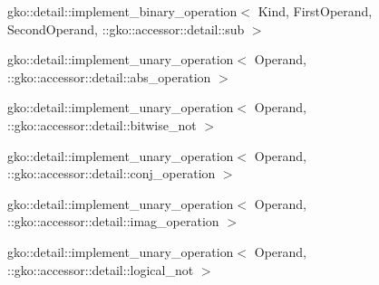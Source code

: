 \begin{DoxyCompactList}
\begin{DoxyCompactList}
\end{DoxyCompactList}
\item gko\+:\+:detail\+:\+:implement\+\_\+binary\+\_\+operation$<$ Kind, First\+Operand, Second\+Operand, \+:\+:gko\+:\+:accessor\+:\+:detail\+:\+:sub $>$\begin{DoxyCompactList}
\item {}
\end{DoxyCompactList}
\item gko\+:\+:detail\+:\+:implement\+\_\+unary\+\_\+operation$<$ Operand, \+:\+:gko\+:\+:accessor\+:\+:detail\+:\+:abs\+\_\+operation $>$\begin{DoxyCompactList}
\item {}
\end{DoxyCompactList}
\item gko\+:\+:detail\+:\+:implement\+\_\+unary\+\_\+operation$<$ Operand, \+:\+:gko\+:\+:accessor\+:\+:detail\+:\+:bitwise\+\_\+not $>$\begin{DoxyCompactList}
\item {}
\end{DoxyCompactList}
\item gko\+:\+:detail\+:\+:implement\+\_\+unary\+\_\+operation$<$ Operand, \+:\+:gko\+:\+:accessor\+:\+:detail\+:\+:conj\+\_\+operation $>$\begin{DoxyCompactList}
\item {}
\end{DoxyCompactList}
\item gko\+:\+:detail\+:\+:implement\+\_\+unary\+\_\+operation$<$ Operand, \+:\+:gko\+:\+:accessor\+:\+:detail\+:\+:imag\+\_\+operation $>$\begin{DoxyCompactList}
\item {}
\end{DoxyCompactList}
\item gko\+:\+:detail\+:\+:implement\+\_\+unary\+\_\+operation$<$ Operand, \+:\+:gko\+:\+:accessor\+:\+:detail\+:\+:logical\+\_\+not $>$\begin{DoxyCompactList}

\end{DoxyCompactList}
\end{DoxyCompactList}
